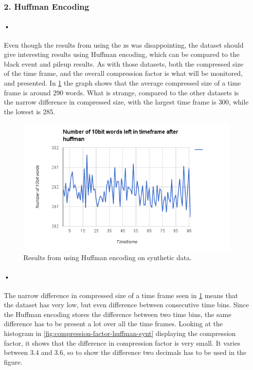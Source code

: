 \documentclass[a4paper, 12pt]{report}\dfrac{\right }{•}
\begin{document}
\subsubsection{2. Huffman Encoding}

\paragraph{•}
Even though the results from using the \gls{zs} was disappointing, the dataset should give interesting results using Huffman encoding, which can be compared to the black event and pileup results.
As with those datasets, both the compressed size of the time frame, and the overall compression factor is what will be monitored, and presented.
In \ref{fig:synthetic-huffman} the graph shows that the average compressed size of a time frame is around 290 words.
What is strange, compared to the other datasets is the narrow difference in compressed size, with the largest time frame is 300, while the lowest is 285.


\begin{figure}[h!]
	\centering
		\includegraphics[width=1.0\textwidth]{images/huffman-fake-pileup.png}
		\caption{Results from using Huffman encoding on synthetic data.}
		\label{fig:synthetic-huffman}
\end{figure}

\paragraph{•}
The narrow difference in compressed size of a time frame seen in \ref{fig:synthetic-huffman} means that the dataset has very low, but even difference between consecutive time bins.
Since the Huffman encoding stores the difference between two time bins, the same difference has to be present a lot over all the time frames.
Looking at the histogram in \ref{fig:compression-factor-huffman-synt} displaying the compression factor, it shows that the difference in compression factor is very small.
It varies between 3.4 and 3.6, so to show the difference two decimals has to be used in the figure.
\end{document}
